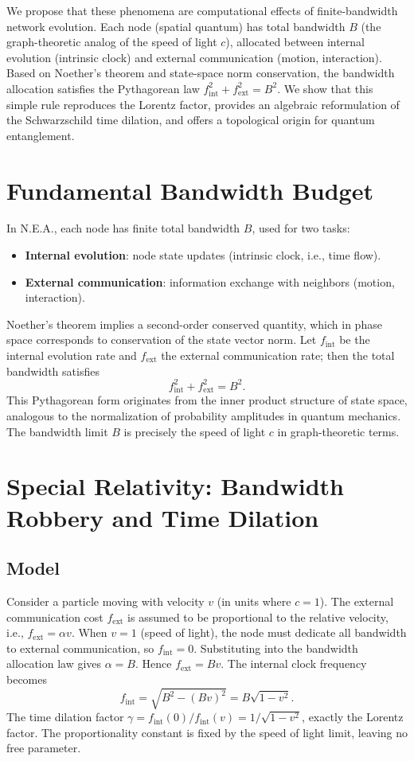 \documentclass[12pt,a4paper]{article}
\begin{document}
We propose that these phenomena are computational effects of finite-bandwidth network evolution. Each node (spatial quantum) has total bandwidth $B$ (the graph-theoretic analog of the speed of light $c$), allocated between internal evolution (intrinsic clock) and external communication (motion, interaction). Based on Noether's theorem and state-space norm conservation, the bandwidth allocation satisfies the Pythagorean law $f_{\text{int}}^2 + f_{\text{ext}}^2 = B^2$. We show that this simple rule reproduces the Lorentz factor, provides an algebraic reformulation of the Schwarzschild time dilation, and offers a topological origin for quantum entanglement.

\section{Fundamental Bandwidth Budget}
In N.E.A., each node has finite total bandwidth $B$, used for two tasks:
\begin{itemize}
    \item \textbf{Internal evolution}: node state updates (intrinsic clock, i.e., time flow).
    \item \textbf{External communication}: information exchange with neighbors (motion, interaction).
\end{itemize}
Noether's theorem implies a second-order conserved quantity, which in phase space corresponds to conservation of the state vector norm. Let $f_{\text{int}}$ be the internal evolution rate and $f_{\text{ext}}$ the external communication rate; then the total bandwidth satisfies
\[
f_{\text{int}}^2 + f_{\text{ext}}^2 = B^2.
\]
This Pythagorean form originates from the inner product structure of state space, analogous to the normalization of probability amplitudes in quantum mechanics. The bandwidth limit $B$ is precisely the speed of light $c$ in graph-theoretic terms.

\section{Special Relativity: Bandwidth Robbery and Time Dilation}
\subsection{Model}
Consider a particle moving with velocity $v$ (in units where $c=1$). The external communication cost $f_{\text{ext}}$ is assumed to be proportional to the relative velocity, i.e., $f_{\text{ext}} = \alpha v$. When $v=1$ (speed of light), the node must dedicate all bandwidth to external communication, so $f_{\text{int}}=0$. Substituting into the bandwidth allocation law gives $\alpha = B$. Hence $f_{\text{ext}} = B v$. The internal clock frequency becomes
\[
f_{\text{int}} = \sqrt{B^2 - (B v)^2} = B \sqrt{1-v^2}.
\]
The time dilation factor $\gamma = f_{\text{int}}(0)/f_{\text{int}}(v) = 1/\sqrt{1-v^2}$, exactly the Lorentz factor. The proportionality constant is fixed by the speed of light limit, leaving no free parameter.
\end{document}

